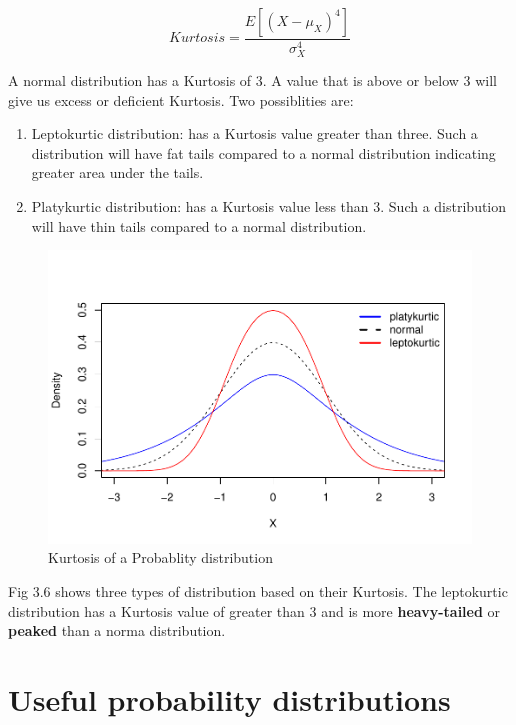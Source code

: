 \documentclass[]{book}
\theoremstyle{definition}
\theoremstyle{definition}
\theoremstyle{definition}
\theoremstyle{remark}
\begin{document}
\[Kurtosis=\frac{E[(X-\mu_X)^4]}{\sigma^4_X}\]

A normal distribution has a Kurtosis of 3. A value that is above or below 3 will give us excess or deficient Kurtosis. Two possiblities are:

\begin{enumerate}
\def\labelenumi{\alph{enumi}.}
\item
  Leptokurtic distribution: has a Kurtosis value greater than three. Such a distribution will have fat tails compared to a normal distribution indicating greater area under the tails.
\item
  Platykurtic distribution: has a Kurtosis value less than 3. Such a distribution will have thin tails compared to a normal distribution.
\end{enumerate}

\begin{figure}

{\centering \includegraphics{bookdown-demo_files/figure-latex/unnamed-chunk-54-1} 

}

\caption{Kurtosis of a Probablity distribution}\label{fig:unnamed-chunk-54}
\end{figure}

Fig 3.6 shows three types of distribution based on their Kurtosis. The leptokurtic distribution has a Kurtosis value of greater than 3 and is more \textbf{heavy-tailed} or \textbf{peaked} than a norma distribution.

\hypertarget{useful-probability-distributions}{%
\section{Useful probability distributions}\label{useful-probability-distributions}}
\end{document}
